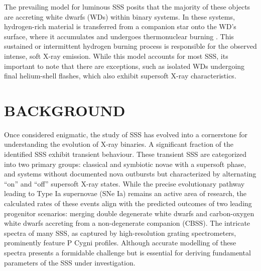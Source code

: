         	The prevailing model for luminous SSS posits that the majority of these objects are accreting white dwarfs (WDs) within binary systems. In these systems, hydrogen-rich material is transferred from a companion star onto the WD's surface, where it accumulates and undergoes thermonuclear burning \cite{van1992accreting}. This sustained or intermittent hydrogen burning process is responsible for the observed intense, soft X-ray emission. While this model accounts for most SSS, its important to note that there are exceptions, such as isolated WDs undergoing final helium-shell flashes, which also exhibit supersoft X-ray characteristics.
    
    \section{\MakeUppercase{Background}} \label{introduction:background}
    	Once considered enigmatic, the study of SSS has evolved into a cornerstone for understanding the evolution of X-ray binaries. A significant fraction of the identified SSS exhibit transient behaviour. These transient SSS are categorized into two primary groups: classical and symbiotic novae with a supersoft phase, and systems without documented nova outbursts but characterized by alternating ``on'' and ``off'' supersoft X-ray states. While the precise evolutionary pathway leading to Type Ia supernovae (SNe Ia) remains an active area of research, the calculated rates of these events align with the predicted outcomes of two leading progenitor scenarios: merging double degenerate white dwarfs and carbon-oxygen white dwarfs accreting from a non-degenerate companion (CBSS). The intricate spectra of many SSS, as captured by high-resolution grating spectrometers, prominently feature P Cygni profiles. Although accurate modelling of these spectra presents a formidable challenge but is essential for deriving fundamental parameters of the SSS under investigation.
    
